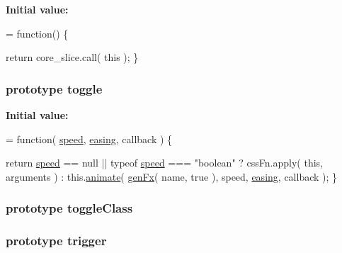 {\bfseries Initial value\-:}
\begin{DoxyCode}
= \textcolor{keyword}{function}() \{


        \textcolor{keywordflow}{return} core\_slice.call( \textcolor{keyword}{this} );
    \}
\end{DoxyCode}
\hypertarget{jquery-1_810_82-vsdoc_8js_a2acbc13778660c4b59c393d8e4c2eb09}{
\subsubsection[{toggle}]{ {\bf prototype} toggle}}\label{jquery-1_810_82-vsdoc_8js_a2acbc13778660c4b59c393d8e4c2eb09}
{\bfseries Initial value\-:}
\begin{DoxyCode}
= \textcolor{keyword}{function}( \hyperlink{jquery-1_810_82-vsdoc_8js_add98c90065e6563cba26ff6d2016c46c}{speed}, \hyperlink{jquery-1_810_82-vsdoc_8js_a9758a312629fa6de1744280dd6e6253b}{easing}, callback ) \{


        \textcolor{keywordflow}{return} \hyperlink{jquery-1_810_82-vsdoc_8js_add98c90065e6563cba26ff6d2016c46c}{speed} == null || typeof \hyperlink{jquery-1_810_82-vsdoc_8js_add98c90065e6563cba26ff6d2016c46c}{speed} === \textcolor{stringliteral}{"boolean"} ?
            cssFn.apply( \textcolor{keyword}{this}, arguments ) :
            this.\hyperlink{jquery-1_810_82-vsdoc_8js_a956a1d08128d41115c45b6815814a64d}{animate}( \hyperlink{jquery-1_810_82_8js_a0dad9ae6c57fd32a071de202faa87081}{genFx}( name, \textcolor{keyword}{true} ), speed, \hyperlink{jquery-1_810_82-vsdoc_8js_a9758a312629fa6de1744280dd6e6253b}{easing}, callback );
    \}
\end{DoxyCode}
\hypertarget{jquery-1_810_82-vsdoc_8js_aa7d62d93d395f57a19fbbdcfd7ff87f1}{
\subsubsection[{toggle\-Class}]{ {\bf prototype} toggle\-Class}}\label{jquery-1_810_82-vsdoc_8js_aa7d62d93d395f57a19fbbdcfd7ff87f1}
\hypertarget{jquery-1_810_82-vsdoc_8js_a2388c4114d5e3e4eab020f973641519c}{
\subsubsection[{trigger}]{ {\bf prototype} trigger}}\label{jquery-1_810_82-vsdoc_8js_a2388c4114d5e3e4eab020f973641519c}
